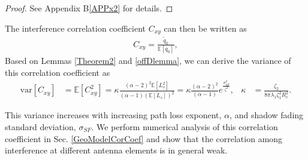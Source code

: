 \documentclass[12pt, draftclsnofoot, onecolumn]{IEEEtran}
\theoremstyle{plain}
\begin{document}
\vspace{-.1in}
\begin{proof}
See Appendix B\ref{APPx2} for details.
\end{proof}

The interference correlation coefficient $C_{xy}$ can then be written as
%
%
\begin{eqnarray}
C_{xy} = \frac{\tilde{\mathit{q}}_{0}}{\mathbb{E}\left[{\mathit{q}}_{0}\right]},
\end{eqnarray}
%
Based on Lemmas \ref{Theorem2} and \ref{offDlemma}, we can derive the variance of this correlation coefficient as 
\begin{align}\label{Cvar}
\text{var} \left[ C_{xy}\right] &= \mathbb{E}\left[C_{xy}^2\right]=\kappa \frac{(\alpha-2)^2 \mathbb{E}\left[\mathit{L}_{s}^2\right]}{(\alpha-1) \left( \mathbb{E}\left[\mathit{L}_{s}\right] \right)^2} = \kappa \frac{(\alpha-2)^2}{(\alpha-1)} e^{\frac{\sigma_{SF}^2}{\zeta^2}}, &
\kappa & = \frac{\zeta_2}{8 \pi \lambda_1 \zeta_1^2 R_c^2}.
\end{align}

This variance increases with increasing path loss exponent, $\alpha$, and  shadow fading standard deviation, $\sigma_{SF}$. 
We perform numerical analysis of this correlation coefficient in Sec. \ref{GeoModelCorCoef} and show that the correlation among interference at different antenna elements is in general weak.
\vspace{-.1in}
\end{document}

